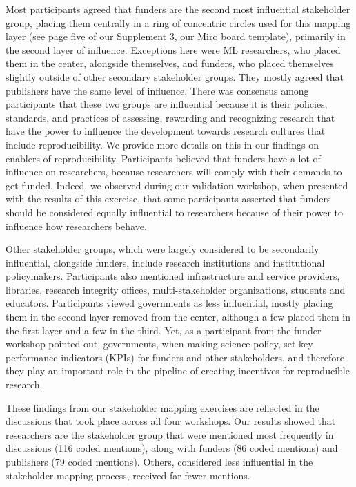 \documentclass[authordate, meta]{jote-new-article}
\begin{document}
	Most participants agreed that funders are the second most influential stakeholder group, placing them centrally in a ring of concentric circles used for this mapping layer (see page five of our \href{https://osf.io/n28sg/files/e4u7q}{Supplement 3}, our Miro board template), primarily in the second layer of influence. Exceptions here were ML researchers, who placed them in the center, alongside themselves, and funders, who placed themselves slightly outside of other secondary stakeholder groups. They mostly agreed that publishers have the same level of influence. There was consensus among participants that these two groups are influential because it is their policies, standards, and practices of assessing, rewarding and recognizing research that have the power to influence the development towards research cultures that include reproducibility. We provide more details on this in our findings on enablers of reproducibility. Participants believed that funders have a lot of influence on researchers, because researchers will comply with their demands to get funded. Indeed, we observed during our validation workshop, when presented with the results of this exercise, that some participants asserted that funders should be considered equally influential to researchers because of their power to influence how researchers behave.



	Other stakeholder groups, which were largely considered to be secondarily influential, alongside funders, include research institutions and institutional policymakers. Participants also mentioned infrastructure and service providers, libraries, research integrity offices, multi-stakeholder organizations, students and educators. Participants viewed governments as less influential, mostly placing them in the second layer removed from the center, although a few placed them in the first layer and a few in the third. Yet, as a participant from the funder workshop pointed out, governments, when making science policy, set key performance indicators (KPIs) for funders and other stakeholders, and therefore they play an important role in the pipeline of creating incentives for reproducible research.



	These findings from our stakeholder mapping exercises are reflected in the discussions that took place across all four workshops. Our results showed that researchers are the stakeholder group that were mentioned most frequently in discussions (116 coded mentions), along with funders (86 coded mentions) and publishers (79 coded mentions). Others, considered less influential in the stakeholder mapping process, received far fewer mentions.
\end{document}
